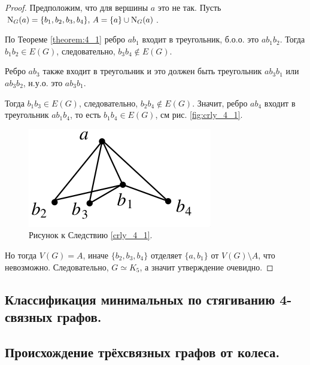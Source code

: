 \begin{proof}

	Предположим, что для вершины $a$ это не так.
	Пусть $\operatorname{N}_G(a) = \{b_1, b_2, b_3, b_4\}, \, A = \{a\} \cup \operatorname{N}_G(a)$.

	По Теореме \ref{theorem:4_1} ребро $ab_1$ входит в треугольник, б.о.о. это $ab_1b_2$.
	Тогда $b_1b_2 \in E(G)$, следовательно, $b_3b_4 \not \in E(G)$.

	Ребро $ab_3$ также входит в треугольник и это должен быть треугольник $ab_3b_1$ или $ab_3b_2$, н.у.о. это $ab_3b_1$.

	Тогда $b_1b_3 \in E(G)$, следовательно, $b_2b_4 \not \in E(G)$.
	Значит, ребро $ab_4$ входит в треугольник $ab_1b_4$, то есть $b_1b_4 \in E(G)$, см рис. \eqref{fig:crly_4_1}.

	\begin{figure}[ht]
    \centering
	\includegraphics[width=0.25\columnwidth]{figures/crly_4_1.png}
	\caption{Рисунок к Следствию \ref{crly_4_1}.}
    \label{fig:crly_4_1}
	\end{figure}
	Но тогда $V(G) = A$, иначе  $\{b_2, b_3, b_4\}$ отделяет $\{a, b_1\}$ от $V(G) \setminus A$, что невозможно. Следовательно,  $G \simeq K_5$, а значит утверждение очевидно.


\end{proof}

\subsection{Классификация минимальных по стягиванию 4-связных графов.}

\subsection{Происхождение трёхсвязных графов от колеса.}
